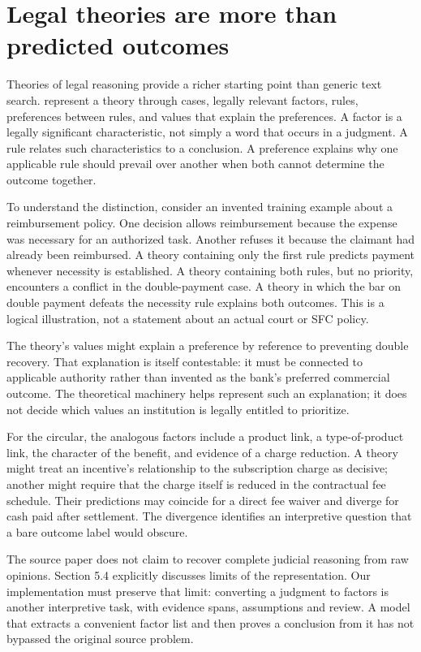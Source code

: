 \section{Legal theories are more than predicted outcomes}

Theories of legal reasoning provide a richer starting point than generic text
search. \citet[sections 3--5]{theories2003} represent a theory through cases,
legally relevant factors, rules, preferences between rules, and values that
explain the preferences. A factor is a legally significant characteristic, not
simply a word that occurs in a judgment. A rule relates such characteristics to a
conclusion. A preference explains why one applicable rule should prevail over
another when both cannot determine the outcome together.

To understand the distinction, consider an invented training example about a
reimbursement policy. One decision allows reimbursement because the expense was
necessary for an authorized task. Another refuses it because the claimant had
already been reimbursed. A theory containing only the first rule predicts payment
whenever necessity is established. A theory containing both rules, but no
priority, encounters a conflict in the double-payment case. A theory in which the
bar on double payment defeats the necessity rule explains both outcomes. This is
a logical illustration, not a statement about an actual court or SFC policy.

The theory's values might explain a preference by reference to preventing double
recovery. That explanation is itself contestable: it must be connected to
applicable authority rather than invented as the bank's preferred commercial
outcome. The theoretical machinery helps represent such an explanation; it does
not decide which values an institution is legally entitled to prioritize.

For the circular, the analogous factors include a product link, a type-of-product
link, the character of the benefit, and evidence of a charge reduction. A theory
might treat an incentive's relationship to the subscription charge as decisive;
another might require that the charge itself is reduced in the contractual fee
schedule. Their predictions may coincide for a direct fee waiver and diverge for
cash paid after settlement. The divergence identifies an interpretive question
that a bare outcome label would obscure.

The source paper does not claim to recover complete judicial reasoning from raw
opinions. Section 5.4 explicitly discusses limits of the representation. Our
implementation must preserve that limit: converting a judgment to factors is
another interpretive task, with evidence spans, assumptions and review. A model
that extracts a convenient factor list and then proves a conclusion from it has
not bypassed the original source problem.


